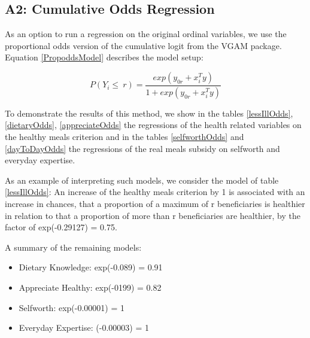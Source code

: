 \documentclass[12pt, a4paper, titlepage]{article}\usepackage[]{graphicx}\usepackage[]{color}
\begin{document}
\subsection{A2: Cumulative Odds Regression} 

As an option to run a regression on the original ordinal variables, we use the proportional odds version of the cumulative logit from the VGAM package. Equation \ref{PropoddsModel} describes the model setup: 

 
\begin{equation}
\label{PropoddsModel}
  P(Y_i \leq \ r) = \frac{exp(y_{0r} + x_i^Ty)}{1+exp(y_{0r} + x_i^Ty)}    
\end{equation}


To demonstrate the results of this method, we show in the tables \ref{lessIllOdds}, \ref{dietaryOdds}, \ref{appreciateOdds} the regressions of the health related variables on the healthy meals criterion and in the tables \ref{selfworthOdds} and \ref{dayToDayOdds} the regressions of the real meals subsidy on selfworth and everyday expertise. 

As an example of interpreting such models, we consider the model of table \ref{lessIllOdds}: An increase of the healthy meals criterion by 1 is associated with an increase in chances, that a proportion of a maximum of r beneficiaries is healthier in relation to that a proportion of more than r beneficiaries are healthier, by the factor of exp(-0.29127) = 0.75.

A summary of the remaining models:

\begin{itemize}
  \item{Dietary Knowledge: exp(-0.089) = 0.91}
  \item{Appreciate Healthy: exp(-0199) = 0.82}
  \item{Selfworth: exp(-0.00001) = 1}
  \item{Everyday Expertise: (-0.00003) = 1} 
\end{itemize}
\end{document}
